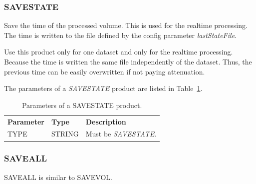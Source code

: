 \documentclass[a4paper,11pt,pdftex,twoside]{scrartcl}
\renewcommand{\bf}{\normalfont \bfseries}
\begin{document}
{{{\subsubsection{SAVESTATE}
 \label{subsec_savestate}

Save the time of the processed volume. This is used for the realtime processing.
 The time is written to the file defined by the config parameter \emph{lastStateFile}.

Use this product only for one dataset and only for the realtime processing.
 Because the time is written the same file independently of the dataset. Thus, the previous
 time can be easily overwritten if not paying attenuation.

The parameters of a \emph{SAVESTATE} product are listed in Table~\ref{tab_product_savestate}.

\begin{table}[H]
 \begin{tabularx}{\textwidth}{llX}
 \bf{Parameter}  & \bf{Type}  & \bf{Description}\\
 TYPE           & STRING     & Must be \emph{SAVESTATE}.\\
 \end{tabularx}
 \caption{Parameters of a SAVESTATE product.}
 \label{tab_product_savestate}
 \end{table}

\subsubsection{SAVEALL}
   \label{subsec_saveall}
SAVEALL is similar to SAVEVOL.





}}}
\end{document}
